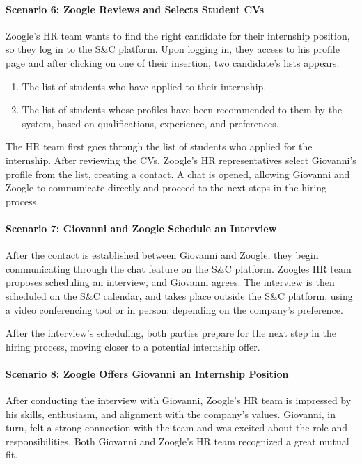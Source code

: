 \paragraph{Scenario 6: Zoogle Reviews and Selects Student CVs
}Zoogle's HR team wants to find the right candidate for their internship
position, so they log in to the S\&C platform. Upon logging in, they
access to his profile page and after clicking on one of their insertion,
two candidate's lists appears:

\begin{enumerate}
\def\labelenumi{\arabic{enumi}.}
\item
  The list of students who have applied to their internship.
\item
  The list of students whose profiles have been recommended to them by
  the system, based on qualifications, experience, and preferences.~
\end{enumerate}

The HR team first goes through the list of students who applied for the
internship. After reviewing the CVs, Zoogle's HR representatives select
Giovanni's profile from the list, creating a contact. A chat is opened,
allowing Giovanni and Zoogle to communicate directly and proceed to the
next steps in the hiring process.

\paragraph{Scenario 7: Giovanni and Zoogle Schedule an Interview\\
}After the contact is established between Giovanni and Zoogle, they
begin communicating through the chat feature on the S\&C platform.
Zoogle\textquotesingle s HR team proposes scheduling an interview, and
Giovanni agrees. The interview is then scheduled on the S\&C
calendar\textbf{,} and takes place outside the S\&C platform, using a
video conferencing tool or in person, depending on the company's
preference.

After the interview's scheduling, both parties prepare for the next step
in the hiring process, moving closer to a potential internship offer.

\paragraph{Scenario 8: Zoogle Offers Giovanni an Internship Position
}After conducting the interview with Giovanni, Zoogle's HR team is
impressed by his skills, enthusiasm, and alignment with the company's
values. Giovanni, in turn, felt a strong connection with the team and
was excited about the role and responsibilities. Both Giovanni and
Zoogle's HR team recognized a great mutual fit.

